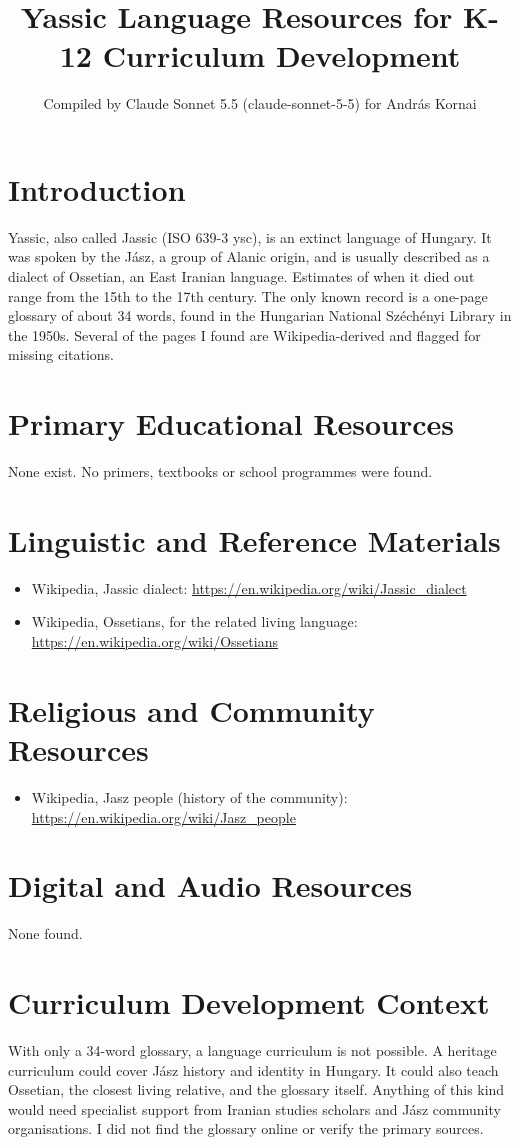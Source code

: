 \documentclass[12pt]{article}
\title{Yassic Language Resources for K-12 Curriculum Development}
\author{Compiled by Claude Sonnet 5.5 (claude-sonnet-5-5) for Andr\'as Kornai}
\date{}
\begin{document}
\maketitle

\section{Introduction}
Yassic, also called Jassic (ISO 639-3 ysc), is an extinct language of Hungary. It was spoken by the Jász, a group of Alanic origin, and is usually described as a dialect of Ossetian, an East Iranian language. Estimates of when it died out range from the 15th to the 17th century. The only known record is a one-page glossary of about 34 words, found in the Hungarian National Széchényi Library in the 1950s. Several of the pages I found are Wikipedia-derived and flagged for missing citations.

\section{Primary Educational Resources}
None exist. No primers, textbooks or school programmes were found.

\section{Linguistic and Reference Materials}
\begin{itemize}
\item Wikipedia, Jassic dialect: \url{https://en.wikipedia.org/wiki/Jassic_dialect}
\item Wikipedia, Ossetians, for the related living language: \url{https://en.wikipedia.org/wiki/Ossetians}
\end{itemize}

\section{Religious and Community Resources}
\begin{itemize}
\item Wikipedia, Jasz people (history of the community): \url{https://en.wikipedia.org/wiki/Jasz_people}
\end{itemize}

\section{Digital and Audio Resources}
None found.

\section{Curriculum Development Context}
With only a 34-word glossary, a language curriculum is not possible. A heritage curriculum could cover Jász history and identity in Hungary. It could also teach Ossetian, the closest living relative, and the glossary itself. Anything of this kind would need specialist support from Iranian studies scholars and Jász community organisations. I did not find the glossary online or verify the primary sources.
\end{document}
